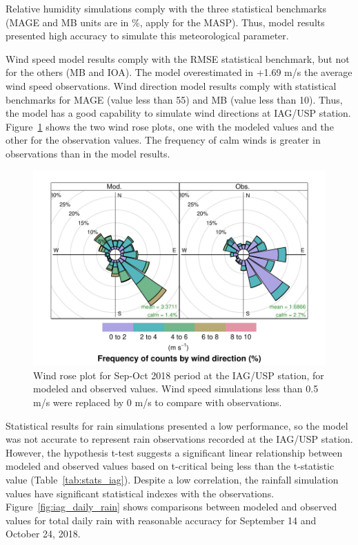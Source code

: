 Relative humidity simulations comply with the three statistical benchmarks (MAGE and MB units are in \%, apply for the MASP).
Thus, model results presented high accuracy to simulate this meteorological parameter.

Wind speed model results comply with the RMSE statistical benchmark, but not for the others (MB and IOA).
The model overestimated in +1.69 m/s the average wind speed observations.
Wind direction model results comply with statistical benchmarks for MAGE (value less than 55) and MB (value less than 10).
Thus, the model has a good capability to simulate wind directions at IAG/USP station.
Figure~\ref{fig:wrplot_iag} shows the two wind rose plots, one with the modeled values and the other for the observation values. 
The frequency of calm winds is greater in observations than in the model results.

\begin{figure}[!hbt]
  \centering
  \includegraphics{fig/WRplot_IAG_sep_oct2018}
  \caption{Wind rose plot for Sep-Oct 2018 period at the IAG/USP station, for modeled and observed values. Wind speed simulations less than 0.5 m/s were replaced by 0 m/s to compare with observations.}
  \label{fig:wrplot_iag}
\end{figure}

Statistical results for rain simulations presented a low performance, so the model was not accurate to represent rain observations recorded at the IAG/USP station.
However, the hypothesis t-test suggests a significant linear relationship between modeled and observed values based on t-critical being less than the t-statistic value (Table~\ref{tab:stats_iag}).
Despite a low correlation, the rainfall simulation values have significant statistical indexes with the observations. 
Figure~\ref{fig:iag_daily_rain} shows comparisons between modeled and observed values for total daily rain with reasonable accuracy for September 14 and October 24, 2018.


